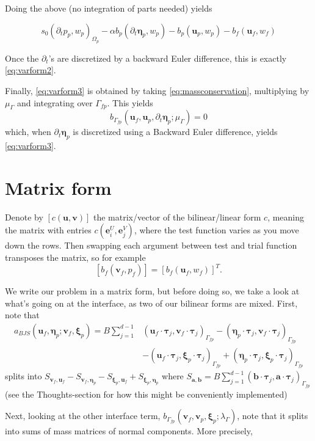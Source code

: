 \documentclass{article}
\newcommand{\mathspace}[1]{\ensuremath{#1}\xspace} %
\newcommand{\inner}[2]{\mathspace{\left (#1, #2 \right)}}
\newcommand{\ddt}[1]{\mathspace{\partial_t #1}}
\newcommand{\matrixform}[1]{\mathspace{\left [ #1 \right ]}}
\newcommand{\taubf}{\mathspace{\boldsymbol{\tau}}}
\newcommand{\darcy}{\mathspace{\Omega_{p}}}
\newcommand{\interface}{\mathspace{\Gamma_{fp}}}
\newcommand{\uf}{\mathspace{\mathbf{u}_f}}
\newcommand{\vf}{\mathspace{\mathbf{v}_f}}
\newcommand{\up}{\mathspace{\mathbf{u}_p}}
\newcommand{\vp}{\mathspace{\mathbf{v}_p}}
\newcommand{\pf}{\mathspace{p_f}}
\newcommand{\pp}{\mathspace{p_p}}
\newcommand{\wf}{\mathspace{w_f}}
\renewcommand{\wp}{\mathspace{w_p}}
\newcommand{\disp}{\mathspace{\boldsymbol{\eta}_p}}
\newcommand{\disptest}{\mathspace{\boldsymbol{\xi}_p}}
\newcommand{\mult}{\mathspace{\lambda_{\Gamma}}}
\newcommand{\multtest}{\mathspace{\mu_{\Gamma}}}
\begin{document}
Doing the above (no integration of parts needed) yields

$$s_0\inner{\ddt{\pp}}{\wp}_{\darcy} - \alpha b_p(\ddt{\disp}, \wp)
- b_p(\up, \wp) - b_f(\uf, \wf)$$ 

Once the \ddt{}'s are discretized by a backward Euler difference, this is exactly \eqref{eq:varform2}.

Finally, \eqref{eq:varform3} is obtained by taking \eqref{eq:massconservation}, multiplying by \multtest and integrating over \interface. This yields $$b_{\interface} (\uf, \up, \ddt{\disp} ;\multtest) = 0$$
which, when \ddt{\disp} is discretized using a Backward Euler difference, yields \eqref{eq:varform3}.



\section{Matrix form}
Denote by $\matrixform{c(\mathbf{u}, \mathbf{v})}$ the matrix/vector of the bilinear/linear form $c$, meaning the matrix with entries $c(\mathbf{e}^U_i, \mathbf{e}^V_j)$, where the test function varies as you move down the rows. Then swapping each argument between test and trial function transposes the matrix, so for example $$\matrixform{b_f(\vf, \pf)} = \matrixform{b_f(\uf, \wf)}^T. $$
 
We write our problem in a matrix form, but before doing so, we take a look at what's going on at the interface, as two of our bilinear forms are mixed. First, note that
\begin{align*}
a_{BJS}(\uf, \disp; \vf, \disptest) = B \sum_{j=1}^{d-1} & \inner{\uf \cdot \taubf_j}{\vf \cdot \taubf_j}_{\interface} - \inner{\disp \cdot \taubf_j}{\vf \cdot \taubf_j}_{\interface} \\
                                                         & - \inner{\uf \cdot \taubf_j}{\disptest \cdot \taubf_j}_{\interface}+ \inner{\disp \cdot \taubf_j}{\disptest \cdot \taubf_j}_{\interface}
\end{align*}
splits into $S_{\vf, \uf} - S_{\vf, \disp} - S_{\disptest, \uf} + S_{\disptest, \disp}$
where $S_{\mathbf{a}, \mathbf{b}} = B \sum_{j=1}^{d-1} \inner{\mathbf{b} \cdot \taubf_j}{\mathbf{a} \cdot \taubf_j}_{\interface}$ (see the Thoughts-section for how this might be conveniently implemented)

Next, looking at the other interface term, $b_{\interface}(\vf, \vp, \disptest; \mult)$, note that it splits into sums of mass matrices of normal components. More precisely,
\end{document}
